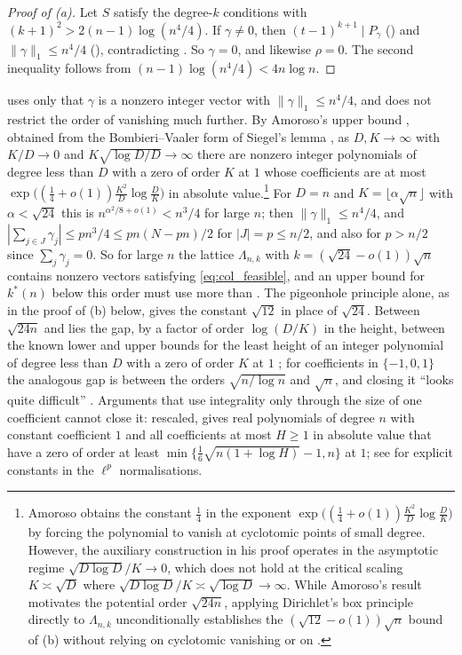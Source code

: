 \begin{proof}[Proof of (a)]
Let $S$ satisfy the degree-$k$ conditions with $(k+1)^2>2(n-1)\log(n^4/4)$.
If $\gamma\ne0$, then $(t-1)^{k+1}\mid P_\gamma$ () and $\|\gamma\|_1\le n^4/4$ (), contradicting .
So $\gamma=0$, and likewise $\rho=0$.
The second inequality follows from $(n-1)\log(n^4/4)<4n\log n$.
\end{proof}

 uses only that $\gamma$ is a nonzero integer vector with $\|\gamma\|_1\le n^4/4$, and  does not restrict the order of vanishing much further.
By Amoroso's upper bound \cite[Thm.~2]{amoroso1995}, obtained from the Bombieri--Vaaler form of Siegel's lemma \cite{bombieri1987low}, as $D,K\to\infty$ with $K/D\to0$ and $K\sqrt{\log D/D}\to\infty$ there are nonzero integer polynomials of degree less than $D$ with a zero of order $K$ at $1$ whose coefficients are at most $\exp\bigl((\frac14+o(1))\frac{K^2}D\log\frac DK\bigr)$ in absolute value.\footnote{Amoroso \cite[Thm.~2]{amoroso1995} obtains the constant $\frac14$ in the exponent $\exp\bigl((\frac14+o(1))\frac{K^2}D\log\frac DK\bigr)$ by forcing the polynomial to vanish at cyclotomic points of small degree. However, the auxiliary construction in his proof operates in the asymptotic regime $\sqrt{D\log D}/K\to0$, which does not hold at the critical scaling $K\asymp\sqrt D$ where $\sqrt{D\log D}/K\asymp\sqrt{\log D}\to\infty$. While Amoroso's result motivates the potential order $\sqrt{24n}$, applying Dirichlet's box principle directly to $\Lambda_{n,k}$ unconditionally establishes the $(\sqrt{12}-o(1))\sqrt n$ bound of (b) without relying on cyclotomic vanishing or on \cite{amoroso1995}.}
For $D=n$ and $K=\lfloor\alpha\sqrt n\rfloor$ with $\alpha<\sqrt{24}$ this is $n^{\alpha^2/8+o(1)}<n^3/4$ for large $n$; then $\|\gamma\|_1\le n^4/4$, and $|\sum_{j\in J}\gamma_j|\le pn^3/4\le pn(N-pn)/2$ for $|J|=p\le n/2$, and also for $p>n/2$ since $\sum_j\gamma_j=0$.
So for large $n$ the lattice $\Lambda_{n,k}$ with $k=(\sqrt{24}-o(1))\sqrt n$ contains nonzero vectors satisfying \eqref{eq:col_feasible}, and an upper bound for $k^*(n)$ below this order must use more than .
The pigeonhole principle alone, as in the proof of (b) below, gives the constant $\sqrt{12}$ in place of $\sqrt{24}$.
Between $\sqrt{24n}$ and  lies the gap, by a factor of order $\log(D/K)$ in the height, between the known lower and upper bounds for the least height of an integer polynomial of degree less than $D$ with a zero of order $K$ at $1$ \cite{mignotte1982,bombieri1987low,amoroso1995}; for coefficients in $\{-1,0,1\}$ the analogous gap is between the orders $\sqrt{n/\log n}$ and $\sqrt n$, and closing it ``looks quite difficult'' \cite[Sect.~2]{BEK1999}.
Arguments that use integrality only through the size of one coefficient cannot close it: rescaled, \cite[Thm.~2.3]{BEK1999} gives real polynomials of degree $n$ with constant coefficient $1$ and all coefficients at most $H\ge1$ in absolute value that have a zero of order at least $\min\{\frac16\sqrt{n(1+\log H)}-1,n\}$ at $1$; see \cite[Thms.~2.1 and 2.2]{erdelyi2016} for explicit constants in the $\ell^p$ normalisations.

